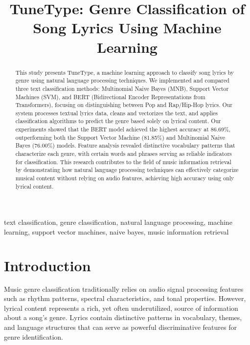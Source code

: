 \documentclass[conference]{IEEEtran}
\begin{document}
\title{TuneType: Genre Classification of Song Lyrics Using Machine Learning}

\author{
\and
{}
\and
{}
}


\maketitle

\begin{abstract}
This study presents TuneType, a machine learning approach to classify song lyrics by genre using natural language processing techniques. We implemented and compared three text classification methods: Multinomial Naive Bayes (MNB), Support Vector Machines (SVM), and BERT (Bidirectional Encoder Representations from Transformers), focusing on distinguishing between Pop and Rap/Hip-Hop lyrics. Our system processes textual lyrics data, cleans and vectorizes the text, and applies classification algorithms to predict the genre based solely on lyrical content. Our experiments showed that the BERT model achieved the highest accuracy at 86.69\%, outperforming both the Support Vector Machine (81.85\%) and Multinomial Naive Bayes (76.00\%) models. Feature analysis revealed distinctive vocabulary patterns that characterize each genre, with certain words and phrases serving as reliable indicators for classification. This research contributes to the field of music information retrieval by demonstrating how natural language processing techniques can effectively categorize musical content without relying on audio features, achieving high accuracy using only lyrical content.
\end{abstract}

\begin{IEEEkeywords}
text classification, genre classification, natural language processing, machine learning, support vector machines, naive bayes, music information retrieval
\end{IEEEkeywords}

\section{Introduction}
Music genre classification traditionally relies on audio signal processing features such as rhythm patterns, spectral characteristics, and tonal properties. However, lyrical content represents a rich, yet often underutilized, source of information about a song's genre. Lyrics contain distinctive patterns in vocabulary, themes, and language structures that can serve as powerful discriminative features for genre identification.
\end{document}
